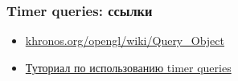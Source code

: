 \documentclass{beamer}
\begin{document}
\begin{frame}[fragile]
\frametitle{Timer queries: ссылки}
\begin{itemize}
\item \href{https://www.khronos.org/opengl/wiki/Query_Object}{khronos.org/opengl/wiki/Query\_Object}
\item \href{https://www.lighthouse3d.com/tutorials/opengl-timer-query}{Туториал по использованию timer queries}
\end{itemize}
\end{frame}
\end{document}
